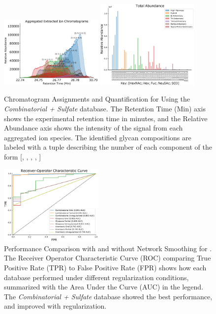     \hfill
    \begin{figure}[!htb]
        \centering
        \includegraphics[width=0.45\textwidth,valign=t]{figure/sulfated_phil_bs_native_chromatograms.eps}
        \includegraphics[width=0.45\textwidth,valign=t]{figure/sulfated_phil_bs_native_abundances.eps}
        \caption{Chromatogram Assignments and Quantification
                 for \philbs Using the \textit{Combinatorial + Sulfate} database.
                 The Retention Time (Min) axis shows the experimental retention time in minutes,
                 and the Relative Abundance axis shows the intensity of
                 the signal from each aggregated ion species. The
                 identified glycan compositions are labeled with a tuple describing the number
                 of each component of the form
                 [, , ,
                  , ]\label{fig:philbs_assignments}}
    \end{figure}
    \hfill
    \begin{figure}[!htb]
        \centering
        \includegraphics[width=0.45\textwidth,valign=t]{figure/sulfated_phil_bs_native_roc.eps}
        \caption{Performance Comparison with and without Network Smoothing for \philbs
                 \label{fig:philbs_perf}. The Receiver Operator Characteristic Curve (ROC)
                 comparing True Positive Rate (TPR) to False Positive Rate (FPR) shows how
                 each database performed under different regularization conditions, summarized
                 with the Area Under the Curve (AUC) in the legend. The \textit{Combinatorial + Sulfate}
                 database showed the best performance, and improved with regularization.}
    \end{figure}

